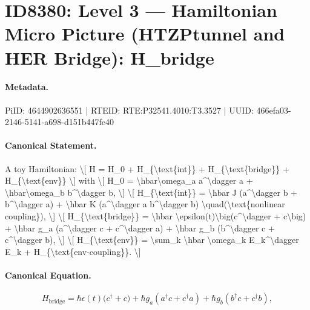 \section*{ID8380: Level 3 — Hamiltonian Micro Picture (HTZPtunnel and HER Bridge): H\_bridge}
\paragraph{Metadata.}
PiID: 4644902636551 | RTEID: RTE:P32541.4010:T3.3527 | UUID: 466efa03-2146-5141-a698-d151b447fe40

\paragraph{Canonical Statement.}
A toy Hamiltonian: \textbackslash{}[ H = H\_0 + H\_\{\textbackslash{}text\{int\}\} + H\_\{\textbackslash{}text\{bridge\}\} + H\_\{\textbackslash{}text\{env\}\} \textbackslash{}] with \textbackslash{}[ H\_0 = \textbackslash{}hbar\textbackslash{}omega\_a a\textasciicircum{}\textbackslash{}dagger a + \textbackslash{}hbar\textbackslash{}omega\_b b\textasciicircum{}\textbackslash{}dagger b, \textbackslash{}] \textbackslash{}[ H\_\{\textbackslash{}text\{int\}\} = \textbackslash{}hbar J (a\textasciicircum{}\textbackslash{}dagger b + b\textasciicircum{}\textbackslash{}dagger a) + \textbackslash{}hbar K (a\textasciicircum{}\textbackslash{}dagger a b\textasciicircum{}\textbackslash{}dagger b) \textbackslash{}quad(\textbackslash{}text\{nonlinear coupling\}), \textbackslash{}] \textbackslash{}[ H\_\{\textbackslash{}text\{bridge\}\} = \textbackslash{}hbar \textbackslash{}epsilon(t)\textbackslash{}big(c\textasciicircum{}\textbackslash{}dagger + c\textbackslash{}big) + \textbackslash{}hbar g\_a (a\textasciicircum{}\textbackslash{}dagger c + c\textasciicircum{}\textbackslash{}dagger a) + \textbackslash{}hbar g\_b (b\textasciicircum{}\textbackslash{}dagger c + c\textasciicircum{}\textbackslash{}dagger b), \textbackslash{}] \textbackslash{}[ H\_\{\textbackslash{}text\{env\}\} = \textbackslash{}sum\_k \textbackslash{}hbar \textbackslash{}omega\_k E\_k\textasciicircum{}\textbackslash{}dagger E\_k + H\_\{\textbackslash{}text\{env-coupling\}\}. \textbackslash{}]

\paragraph{Canonical Equation.}
\[
H_{\text{bridge}} = \hbar \epsilon(t)\big(c^\dagger + c\big) + \hbar g_a (a^\dagger c + c^\dagger a) + \hbar g_b (b^\dagger c + c^\dagger b),
\]

